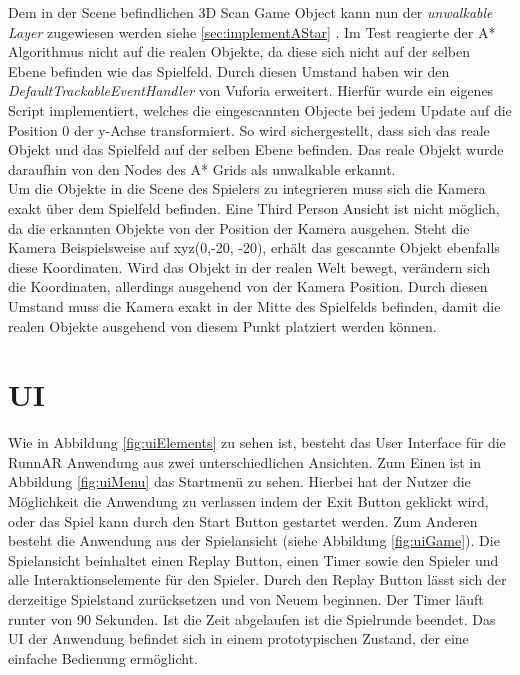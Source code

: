 Dem in der Scene befindlichen 3D Scan Game Object kann nun der \textit{unwalkable Layer} zugewiesen werden siehe \ref{sec:implementAStar} . Im Test reagierte der A* Algorithmus nicht auf die realen Objekte, da diese sich nicht auf der selben Ebene befinden wie das Spielfeld. Durch diesen Umstand haben wir den \textit{DefaultTrackableEventHandler} von Vuforia erweitert. Hierfür wurde ein eigenes Script implementiert, welches die eingescannten Objecte bei jedem Update auf die Position 0 der y-Achse transformiert. So wird sichergestellt, dass sich das reale Objekt und das Spielfeld auf der selben Ebene befinden. Das reale Objekt wurde daraufhin von den Nodes des A* Grids als unwalkable erkannt. \\
Um die Objekte in die Scene des Spielers zu integrieren muss sich die Kamera exakt über dem Spielfeld befinden. Eine Third Person Ansicht ist nicht möglich, da die erkannten Objekte von der Position der Kamera ausgehen. Steht die Kamera Beispielsweise auf xyz(0,-20, -20), erhält das gescannte Objekt ebenfalls diese Koordinaten. Wird das Objekt in der realen Welt bewegt, verändern sich die Koordinaten, allerdings ausgehend von der Kamera Position. Durch diesen Umstand muss die Kamera exakt in der Mitte des Spielfelds befinden, damit die realen Objekte ausgehend von diesem Punkt platziert werden können.

\section{UI}
Wie in Abbildung \ref{fig:uiElements} zu sehen ist, besteht das User Interface für die RunnAR Anwendung aus zwei unterschiedlichen Ansichten. Zum Einen ist in Abbildung \ref{fig:uiMenu} das Startmenü zu sehen. Hierbei hat der Nutzer die Möglichkeit die Anwendung zu verlassen indem der Exit Button geklickt wird, oder das Spiel kann durch den Start Button gestartet werden. Zum Anderen besteht die Anwendung aus der Spielansicht (siehe Abbildung \ref{fig:uiGame}). Die Spielansicht beinhaltet einen Replay Button, einen Timer sowie den Spieler und alle Interaktionselemente für den Spieler. Durch den Replay Button lässt sich der derzeitige Spielstand zurücksetzen und von Neuem beginnen. Der Timer läuft runter von 90 Sekunden. Ist die Zeit abgelaufen ist die Spielrunde beendet. Das UI der Anwendung befindet sich in einem prototypischen Zustand, der eine einfache Bedienung ermöglicht.

